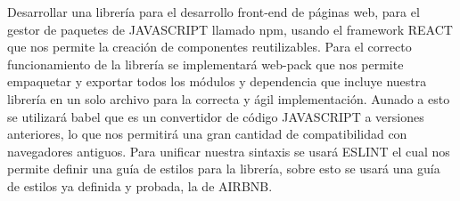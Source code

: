 Desarrollar una librería para el desarrollo front-end de páginas web, para el gestor de paquetes de JAVASCRIPT llamado npm, usando el framework REACT que nos permite la creación de componentes reutilizables. Para el correcto funcionamiento de la librería se implementará web-pack que nos permite empaquetar y exportar todos los módulos y dependencia que incluye nuestra librería en un solo archivo para la correcta y ágil implementación. Aunado a esto se utilizará babel que es un convertidor de código JAVASCRIPT a versiones anteriores, lo que nos permitirá una gran cantidad de compatibilidad con navegadores antiguos. Para unificar nuestra sintaxis se usará ESLINT el cual nos permite definir una guía de estilos para la librería, sobre esto se usará una guía de estilos ya definida y probada, la de AIRBNB. 
\newpage
